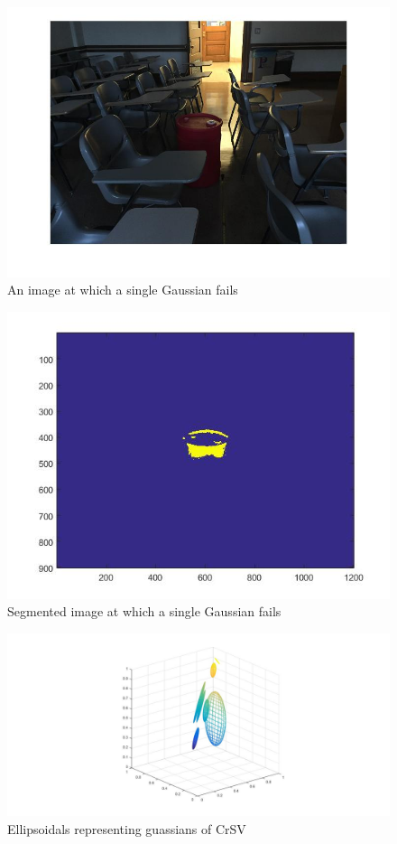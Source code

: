 \documentclass[fleqn,10pt]{SelfArx} %
\begin{document}
\begin{figure}[t]
\centering
\includegraphics[scale=0.2]{sg_org.jpg}
\caption{An image at which a single Gaussian fails}
\label{fig:sg_org}
\end{figure}
\begin{figure}[t]
\centering
\includegraphics[scale=0.3]{sg.jpg}
\caption{Segmented image at which a single Gaussian fails}
\label{fig:sg}
\end{figure}

\begin{figure}[t]
\centering
\includegraphics[trim={11cm 2cm 3cm 2cm},clip,scale=0.3]{elip.jpg}
\caption{Ellipsoidals representing guassians of CrSV}
\label{fig:ellip}
\end{figure}
\end{document}
